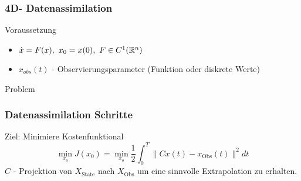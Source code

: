 \begin{frame}
\frametitle{4D- Datenassimilation}
\vspace*{-0.1cm} 
    \begin{block}{Voraussetzung}
    \parbox[c][3.5\baselineskip][t]{\textwidth}{
     \begin{itemize}
     \item $\dot{x} = F(x),~ x_0 = x(0),~F\in C^1(\mathbb R^n)$
     \item $x_{obs}(t)$ - Observierungsparameter (Funktion oder diskrete Werte)
    \end{itemize}
    } 
   \end{block}
   \vspace*{-0.1cm} 
   \begin{block}{Problem}
   \end{block}
\end{frame}



\begin{frame}[<+->]
  \frametitle{Datenassimilation Schritte}
	\begin{block}{Ziel: Minimiere Kostenfunktional}
	\begin{equation}\label{eq:costFunctional}
		\min_{x_o} J(x_0) = \min_{x_o} \frac{1}{2}\int_0^T \|Cx(t) - x_{\text{Obs}}(t)\|^2dt
	\end{equation}
	  $C$ - Projektion von $X_{\text{State}}$ nach $X_{\text{Obs}}$ um eine sinnvolle Extrapolation zu erhalten.
	\end{block}
\end{frame}
 

